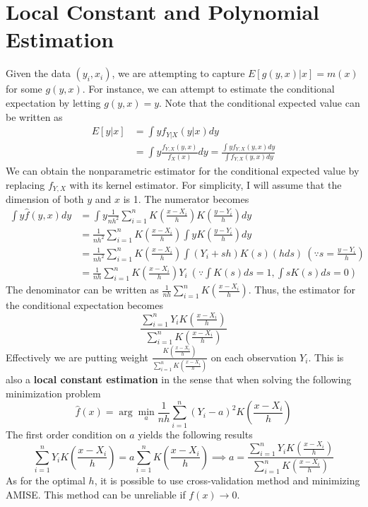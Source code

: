  \section{Local Constant and Polynomial Estimation}
 Given the data $(y_i,x_i)$, we are attempting to capture $E[g(y,x)|x]=m(x)$ for some $g(y,x)$. For instance, we can attempt to estimate the conditional expectation by letting $g(y,x)=y$. Note that the conditional expected value can be written as
 \begin{align*}
 E[y|x]&=\int y f_{Y|X}(y|x)dy \\
 &=\int y \frac{f_{Y,X}(y,x)}{f_{X}(x)}dy=\frac{\int yf_{Y,X}(y,x)dy}{\int f_{Y,X}(y,x)dy}
 \end{align*}
 We can obtain the nonparametric estimator for the conditional expected value by replacing $f_{Y,X}$ with its kernel estimator. For simplicity, I will assume that the dimension of both $y$ and $x$ is 1. The numerator becomes
 \footnotesize{\begin{align*}
 \int y \hat{f}(y,x)dy&=\int y \frac{1}{nh^2}\sum_{i=1}^n K\left(\frac{x-X_i}{h}\right)K\left(\frac{y-Y_i}{h}\right)dy\\
 &= \frac{1}{nh^2}\sum_{i=1}^n K\left(\frac{x-X_i}{h}\right)\int yK\left(\frac{y-Y_i}{h}\right)dy\\
 &=\frac{1}{nh^2}\sum_{i=1}^n K\left(\frac{x-X_i}{h}\right)\int (Y_i+sh)K\left(s\right)(hds) \ (\because s=\frac{y-Y_i}{h})\\
 &= \frac{1}{nh}\sum_{i=1}^n K\left(\frac{x-X_i}{h}\right)Y_i\ (\because \int K(s)ds=1, \int sK(s)ds=0)
 \end{align*}}\normalsize
 The denominator can be written as $ \frac{1}{nh}\sum_{i=1}^n K\left(\frac{x-X_i}{h}\right)$. Thus, the estimator for the conditional expectation becomes
 \[
 \frac{\sum_{i=1}^n Y_iK\left(\frac{x-X_i}{h}\right)}{\sum_{i=1}^n K\left(\frac{x-X_i}{h}\right)}
 \]
 Effectively we are putting weight $\frac{K\left(\frac{x-X_i}{h}\right)}{\sum_{i=1}^nK\left(\frac{x-X_i}{h}\right)}$ on each observation $Y_i$. This is also a \textbf{local constant estimation} in the sense that when solving the following minimization problem
 \[
 \hat{f}(x)=\arg\min_a\frac{1}{nh}\sum_{i=1}^n(Y_i-a)^2K\left(\frac{x-X_i}{h}\right)
 \]
 The first order condition on $a$ yields the following results
 \[
 \sum_{i=1}^nY_iK\left(\frac{x-X_i}{h}\right)=a\sum_{i=1}^nK\left(\frac{x-X_i}{h}\right) \implies a= \frac{\sum_{i=1}^n Y_iK\left(\frac{x-X_i}{h}\right)}{\sum_{i=1}^n K\left(\frac{x-X_i}{h}\right)}
 \]
 As for the optimal $h$, it is possible to use cross-validation method and minimizing AMISE. This method can be unreliable if $f(x)\to0$. \par
